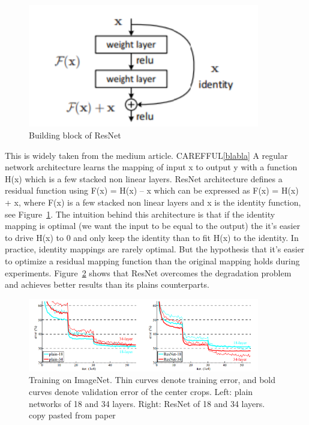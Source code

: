 \begin{figure}[!htp]
    \centering
        \includegraphics[width=0.9\textwidth]{./figures/02-resnet_block}
        \caption{Building block of ResNet}\label{fig:resnetblock}
\end{figure}
This is widely taken from the medium article. CAREFFUL\ref{blabla}
A regular network architecture learns the mapping of input x to output y with a function H(x) which is a few stacked non linear layers. ResNet architecture defines a residual function using F(x) = H(x) – x which can be expressed as F(x) = H(x) + x, where F(x) is a few stacked non linear layers and x is the identity function, see Figure~\ref{fig:resnetblock}. The intuition behind this architecture is that if the identity mapping is optimal (we want the input to be equal to the output) the it’s easier to drive H(x) to 0 and only keep the identity than to fit H(x) to the identity. In practice, identity mappings are rarely optimal. But the hypothesis that it’s easier to optimize a residual mapping function than the original  mapping holds during experiments. Figure~\ref{fig:resnetaccs} shows that ResNet overcomes the degradation problem and achieves better results than its plains counterparts.


\begin{figure}[!htp]
    \centering
        \includegraphics[width=0.9\textwidth]{./figures/02-Resnet_comparing_acc}
        \caption{Training on ImageNet. Thin curves denote training error, and bold curves denote validation error of the center crops. Left: plain
networks of 18 and 34 layers. Right: ResNet of 18 and 34 layers. copy pasted from paper}\label{fig:resnetaccs}
\end{figure}

